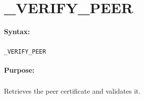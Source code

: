 
\newpage
\section{\_VERIFY\_PEER}
\label{cmd:_VERIFY_PEER}

\paragraph{Syntax:}
\subparagraph{}
\texttt{\_VERIFY\_PEER}

\paragraph{Purpose:}
\subparagraph{}
Retrieves the peer certificate and validates it.